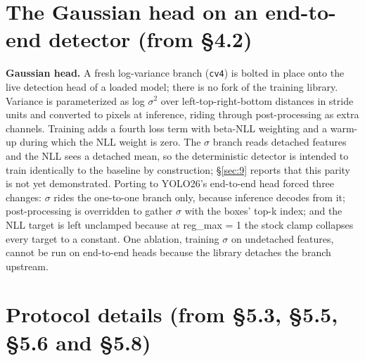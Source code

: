 \documentclass[10pt]{article}
\begin{document}
\section{The Gaussian head on an end-to-end detector (from \S4.2)}\label{app:C}
\textbf{Gaussian head.} A fresh log-variance branch (\texttt{cv4}) is bolted in place onto the live detection head of a loaded model; there is no fork of the training library. Variance is parameterized as log $\sigma$$^{2}$ over left-top-right-bottom distances in stride units and converted to pixels at inference, riding through post-processing as extra channels. Training adds a fourth loss term with beta-NLL weighting \citep{seitzer2022on} and a warm-up during which the NLL weight is zero. The $\sigma$ branch reads detached features and the NLL sees a detached mean, so the deterministic detector is intended to train identically to the baseline by construction; \S\ref{sec:9} reports that this parity is not yet demonstrated. Porting to YOLO26's end-to-end head forced three changes: $\sigma$ rides the one-to-one branch only, because inference decodes from it; post-processing is overridden to gather $\sigma$ with the boxes' top-k index; and the NLL target is left unclamped because at reg\_max = 1 the stock clamp collapses every target to a constant. One ablation, training $\sigma$ on undetached features, cannot be run on end-to-end heads because the library detaches the branch upstream.

\FloatBarrier
\section{Protocol details (from \S5.3, \S5.5, \S5.6 and \S5.8)}\label{app:D}
\end{document}

